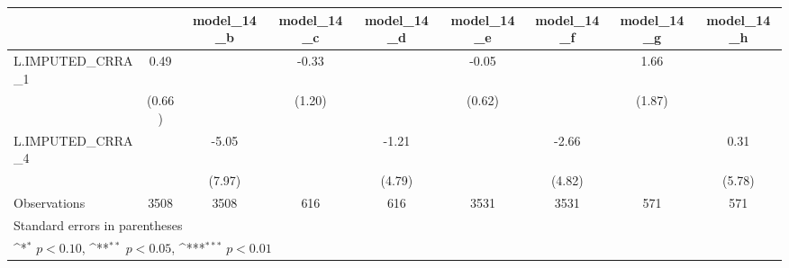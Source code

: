 {
\def\sym#1{\ifmmode^{#1}\else\(^{#1}\)\fi}
\begin{tabular}{l*{8}{c}}
\toprule
                &\multicolumn{1}{c}{}&\multicolumn{1}{c}{model\_14\_b}&\multicolumn{1}{c}{model\_14\_c}&\multicolumn{1}{c}{model\_14\_d}&\multicolumn{1}{c}{model\_14\_e}&\multicolumn{1}{c}{model\_14\_f}&\multicolumn{1}{c}{model\_14\_g}&\multicolumn{1}{c}{model\_14\_h}\\
\midrule
L.IMPUTED\_CRRA\_1&     0.49         &                  &    -0.33         &                  &    -0.05         &                  &     1.66         &                  \\
                &   (0.66)         &                  &   (1.20)         &                  &   (0.62)         &                  &   (1.87)         &                  \\
\addlinespace
L.IMPUTED\_CRRA\_4&                  &    -5.05         &                  &    -1.21         &                  &    -2.66         &                  &     0.31         \\
                &                  &   (7.97)         &                  &   (4.79)         &                  &   (4.82)         &                  &   (5.78)         \\
\midrule
Observations    &     3508         &     3508         &      616         &      616         &     3531         &     3531         &      571         &      571         \\
\bottomrule
\multicolumn{9}{l}{\footnotesize Standard errors in parentheses}\\
\multicolumn{9}{l}{\footnotesize \sym{*} \(p<0.10\), \sym{**} \(p<0.05\), \sym{***} \(p<0.01\)}\\
\end{tabular}
}
